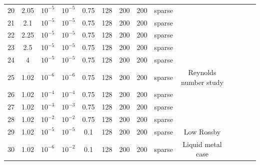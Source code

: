 \documentclass[openacc]{rsproca_new}%
\begin{document}
\begin{tabular}{cccccccccccccc}
20 & 2.05   & $10^{-5}$ & $10^{-5}$ & 0.75 & 128 & 200 & 200 & sparse & \\
21 & 2.1    & $10^{-5}$ & $10^{-5}$ & 0.75 & 128 & 200 & 200 & sparse & \\
22 & 2.25   & $10^{-5}$ & $10^{-5}$ & 0.75 & 128 & 200 & 200 & sparse & \\
23 & 2.5    & $10^{-5}$ & $10^{-5}$ & 0.75 & 128 & 200 & 200 & sparse & \\
24 & 4      & $10^{-5}$ & $10^{-5}$ & 0.75 & 128 & 200 & 200 & sparse & \\
25 & 1.02   & $10^{-6}$ & $10^{-6}$ & 0.75 & 128 & 200 & 200 & sparse & Reynolds number study\\
26 & 1.02   & $10^{-4}$ & $10^{-4}$ & 0.75 & 128 & 200 & 200 & sparse & \\
27 & 1.02   & $10^{-3}$ & $10^{-3}$ & 0.75 & 128 & 200 & 200 & sparse & \\
28 & 1.02   & $10^{-2}$ & $10^{-2}$ & 0.75 & 128 & 200 & 200 & sparse & \\
29 & 1.02   & $10^{-5}$ & $10^{-5}$ & 0.1  & 128 & 200 & 200 & sparse & Low Rossby\\ 
30 & 1.02   & $10^{-6}$ & $10^{-2}$ & 0.1  & 128 & 200 & 200 & sparse & Liquid metal case\\ 
\end{tabular}
\end{document}
